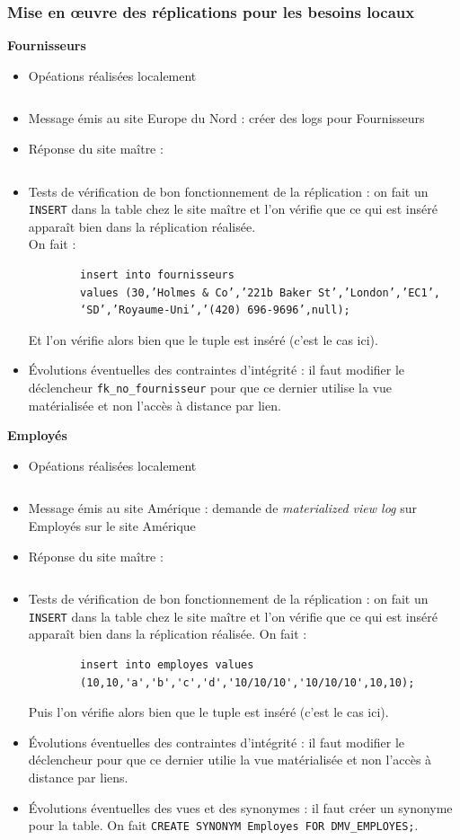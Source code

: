 \documentclass[10pt,a4paper]{article}
\theoremstyle{plain}
\begin{document}
\subsubsection{Mise en \oe uvre des réplications pour les besoins locaux}
\textbf{Fournisseurs}
\begin{itemize}
    \item Opéations réalisées localement
    \inputminted{sql}{EUS_V-A-5-a1.sql}
    \item Message émis au site Europe du Nord : créer des logs pour Fournisseurs 
    \item Réponse du site maître :
    \inputminted{sql}{INSA-DB12-EuropeNord-rep-eu-n.sql}
    \item Tests de vérification de bon fonctionnement de la réplication : on fait un \verb|INSERT| dans la table chez le site maître et l'on vérifie que ce qui est inséré apparaît bien dans la réplication réalisée.\\
    On fait : 
    \begin{verbatim}
    	insert into fournisseurs
    	values (30,’Holmes & Co’,’221b Baker St’,’London’,’EC1’,
    	‘SD’,’Royaume-Uni’,’(420) 696-9696’,null);
    \end{verbatim}
   	Et l'on vérifie alors bien que le tuple est inséré (c'est le cas ici).
    
    \item Évolutions éventuelles des contraintes d'intégrité : il faut modifier le déclencheur \verb|fk_no_fournisseur| pour que ce dernier utilise la vue matérialisée et non l'accès à distance par lien.
\end{itemize}

\textbf{Employés}
\begin{itemize}
    \item Opéations réalisées localement
    \inputminted{sql}{EUS_V-A-5-b1.sql}
    \item Message émis au site Amérique : demande de \emph{materialized view log} sur Employés sur le site Amérique
    \item Réponse du site maître : \inputminted{sql}{EUS_V-A-5-b3.sql}
    \item Tests de vérification de bon fonctionnement de la réplication : on fait un \verb|INSERT| dans la table chez le site maître et l'on vérifie que ce qui est inséré apparaît bien dans la réplication réalisée.
    On fait :
    \begin{verbatim}
    	insert into employes values
    	(10,10,'a','b','c','d','10/10/10','10/10/10',10,10);
    \end{verbatim}
    Puis l'on vérifie alors bien que le tuple est inséré (c'est le cas ici).
    \item Évolutions éventuelles des contraintes d'intégrité : il faut modifier le déclencheur pour que ce dernier utilie la vue matérialisée et non l'accès à distance par liens.
    \item Évolutions éventuelles des vues et des synonymes : il faut créer un synonyme pour la table. On fait \verb|CREATE SYNONYM Employes FOR DMV_EMPLOYES;|.
\end{itemize}
\end{document}
